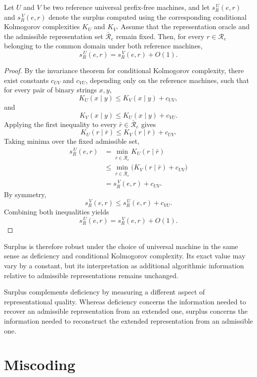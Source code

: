 \begin{proposition}
\label{prop:surplus_machine_invariance}
Let $U$ and $V$ be two reference universal prefix-free machines, and let $s_R^{\,U}(e,r)$ and $s_R^{\,V}(e,r)$ denote the surplus computed using the corresponding conditional Kolmogorov complexities $K_U$ and $K_V$. Assume that the representation oracle and the admissible representation set $\bar{\mathcal R}_e$ remain fixed. Then, for every $r\in\mathcal R_e$ belonging to the common domain under both reference machines,
\[
s_R^{\,U}(e,r) = s_R^{\,V}(e,r) + O(1).
\]
\end{proposition}
\begin{proof}
By the invariance theorem for conditional Kolmogorov complexity, there exist constants $c_{UV}$ and $c_{VU}$, depending only on the reference machines, such that for every pair of binary strings $x,y$,
\[
K_U(x\mid y)\le K_V(x\mid y)+c_{UV},
\]
and
\[
K_V(x\mid y)\le K_U(x\mid y)+c_{VU}.
\]
Applying the first inequality to every $\bar r\in\bar{\mathcal R}_e$ gives
\[
K_U(r\mid\bar r) \le K_V(r\mid\bar r) + c_{UV}.
\]
Taking minima over the fixed admissible set,
\[
\begin{aligned}
s_R^{\,U}(e,r)
& = \min_{\bar r\in\bar{\mathcal R}_e} K_U(r\mid\bar r)\\
& \le \min_{\bar r\in\bar{\mathcal R}_e} \bigl(K_V(r\mid\bar r)+c_{UV}\bigr)\\
& = s_R^{\,V}(e,r)+c_{UV}.
\end{aligned}
\]
By symmetry,
\[
s_R^{\,V}(e,r) \le s_R^{\,U}(e,r)+c_{VU}.
\]
Combining both inequalities yields
\[
s_R^{\,U}(e,r) = s_R^{\,V}(e,r)+O(1).
\]
\end{proof}

Surplus is therefore robust under the choice of universal machine in the same sense as deficiency and conditional Kolmogorov complexity. Its exact value may vary by a constant, but its interpretation as additional algorithmic information relative to admissible representations remains unchanged.

Surplus complements deficiency by measuring a different aspect of representational quality. Whereas deficiency concerns the information needed to recover an admissible representation from an extended one, surplus concerns the information needed to reconstruct the extended representation from an admissible one.

%
%

\section{Miscoding}
\label{sec:miscoding}

